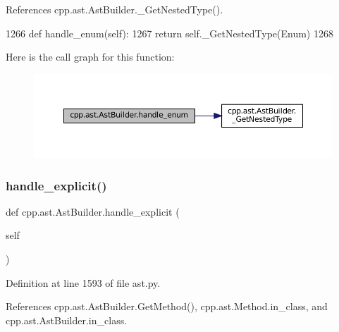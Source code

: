References cpp.\+ast.\+Ast\+Builder.\+\_\+\+Get\+Nested\+Type().


\begin{DoxyCode}
1266     \textcolor{keyword}{def }handle\_enum(self):
1267         \textcolor{keywordflow}{return} self.\_GetNestedType(Enum)
1268 
\end{DoxyCode}
Here is the call graph for this function\+:
\nopagebreak
\begin{figure}[H]
\begin{center}
\leavevmode
\includegraphics[width=350pt]{classcpp_1_1ast_1_1AstBuilder_a341a6ffabadd444a345c8c98a611774c_cgraph}
\end{center}
\end{figure}
\mbox{\label{classcpp_1_1ast_1_1AstBuilder_a568860050542b53d3df9cf479f2a5e1c}} 
\subsubsection{\texorpdfstring{handle\+\_\+explicit()}{handle\_explicit()}}
{\footnotesize\ttfamily def cpp.\+ast.\+Ast\+Builder.\+handle\+\_\+explicit (\begin{DoxyParamCaption}\item[{}]{self }\end{DoxyParamCaption})}



Definition at line 1593 of file ast.\+py.



References cpp.\+ast.\+Ast\+Builder.\+Get\+Method(), cpp.\+ast.\+Method.\+in\+\_\+class, and cpp.\+ast.\+Ast\+Builder.\+in\+\_\+class.


